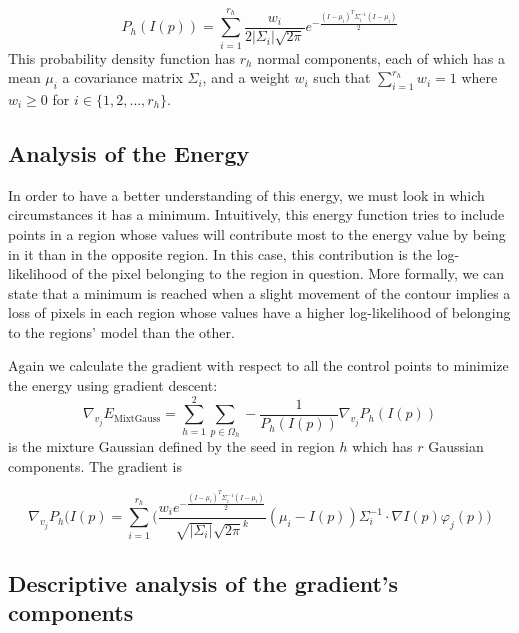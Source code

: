 \begin{equation}
P_h(I(p))=\sum\limits_{i=1}^{r_h}\frac{w_i}{2\vert\Sigma_i\vert\sqrt{2\pi}}e^{-\frac{(I-\mu_i)^T\Sigma_i^{-1}(I-\mu_i)}{2}}
\end{equation}
This probability density function has $r_h$ normal components, each of which has a mean $\mu_i$ a covariance matrix $\Sigma_i$, and a weight $w_i$ such that $\sum\limits_{i=1}^{r_h} w_i=1 $ where $w_i\geq 0$ for $i \in \{1,2, \dots, r_h\} $.

\subsection{Analysis of the Energy}
\label{subsec:analysis_mmge}

In order to have a better understanding of this energy, we must look in which circumstances it has a minimum. Intuitively, this energy function tries to include points in a region whose values will contribute most to the energy value by being in it than in the opposite region. In this case, this contribution is the log-likelihood of the pixel belonging to the region in question.  More formally, we can state that a minimum is reached when a slight movement of the contour implies a loss of pixels in each region whose values have a higher log-likelihood of belonging to the regions' model than the other. 

Again we calculate the gradient with respect to all the control points to minimize the energy using gradient descent: 
\begin{equation}
\nabla_{v_j} E_{\mathrm{MixtGauss}}  = \sum\limits_{h =1}^{2} \sum_{p \in \Omega_h} -\frac{1}{P_h(I(p))}\nabla_{v_j} P_h(I(p))
\end{equation}
is the mixture Gaussian defined by the seed in region $h$ which has $r$ Gaussian components. The gradient is 

\begin{equation}\label{eq:mixture_gradient}
\nabla_{v_j} P_h(I(p)= 
\sum\limits_{i=1}^{r_h} \Biggl( \frac{w_ie^{-\frac{(I-\mu_i)^T\Sigma_i^{-1}(I-\mu_i)}{2}}}{\sqrt{\vert\Sigma_i\vert}\sqrt{2\pi}^k}
(\mu_i-I(p))\Sigma_i^{-1}\cdot\nabla I(p) \varphi_j(p)\Biggr)
\end{equation}


\subsection{Descriptive analysis of the gradient's components}
\label{subsubsec:descriptive_analysis}

